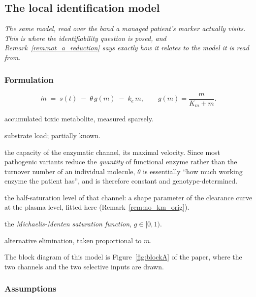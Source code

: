 \subsection{The local identification model}
\label{sec:local}

\emph{The same model, read over the band a managed patient's marker actually visits. This
is where the identifiability question is posed, and Remark~\ref{rem:not_a_reduction} says
exactly how it relates to the model it is read from.}

\subsubsection{Formulation}

\begin{equation}
\dot m \;=\; s(t) \;-\; \theta\, g(m) \;-\; k_e\, m,
\qquad g(m) = \frac{m}{K_m + m}.
\label{eq:A}
\end{equation}

\begin{description}[leftmargin=1.4em, itemsep=1pt]
\item[$m(t)$] accumulated toxic metabolite, measured sparsely.
\item[$s(t)$] substrate load; partially known.
\item[$\theta$] the capacity of the enzymatic channel, its maximal velocity. Since most
pathogenic variants reduce the \emph{quantity} of functional enzyme rather than the turnover
number of an individual molecule, $\theta$ is essentially ``how much working enzyme the
patient has'', and is therefore constant and genotype-determined.
\item[$K_m$] the half-saturation level of that channel: a shape parameter of the clearance
curve at the plasma level, fitted here (Remark~\ref{rem:no_km_orig}).
\item[$g(m)$] the \emph{Michaelis-Menten saturation function}, $g \in [0,1)$.
\item[$k_e m$] alternative elimination, taken proportional to $m$.
\end{description}

The block diagram of this model is Figure~\ref{fig:blockA} of the paper, where the two
channels and the two selective inputs are drawn.

\subsubsection{Assumptions}

